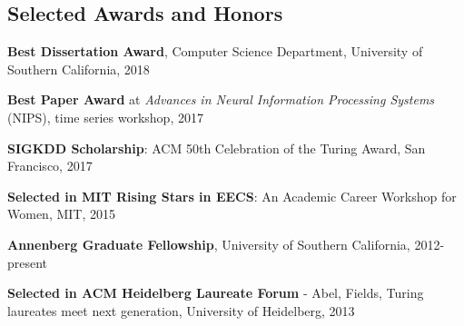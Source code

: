 \documentclass[margin,line]{res}
\newenvironment{list1}{
  \begin{list}{\ding{113}}{%
      \setlength{\itemsep}{0in}
      \setlength{\parsep}{0in} \setlength{\parskip}{0in}
      \setlength{\topsep}{0in} \setlength{\partopsep}{0in} 
      \setlength{\leftmargin}{0.17in}}}{\end{list}}
\begin{document}
\begin{resume}


\section{\sc Selected Awards and Honors} 

\textbf{Best Dissertation Award}, Computer Science Department, University of Southern California, 2018

\textbf{Best Paper Award} at \textit{Advances in Neural Information Processing Systems} (NIPS), time series workshop, 2017

\textbf{SIGKDD Scholarship}: ACM 50th Celebration of the Turing Award, San Francisco, 2017

\textbf{Selected in MIT Rising Stars in EECS}: An Academic Career Workshop for Women, MIT, 2015

\textbf{Annenberg Graduate Fellowship}, University of Southern California, 2012-present







%

\textbf{Selected in ACM Heidelberg Laureate Forum }- Abel, Fields, Turing laureates meet next generation, University of Heidelberg, 2013





\end{resume}
\end{document}
